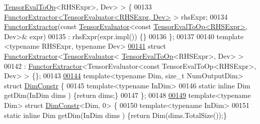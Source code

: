 \begin{DoxyCode}
      \hyperlink{class_eigen_1_1_tensor_eval_to_op}{TensorEvalToOp}<RHSExpr>, Dev> > \{
00133   \hyperlink{struct_eigen_1_1_tensor_sycl_1_1internal_1_1_functor_extractor}{FunctorExtractor<TensorEvaluator<RHSExpr, Dev>} > rhsExpr;
00134   \hyperlink{struct_eigen_1_1_tensor_sycl_1_1internal_1_1_functor_extractor}{FunctorExtractor}(\textcolor{keyword}{const} \hyperlink{struct_eigen_1_1_tensor_evaluator}{TensorEvaluator}<\textcolor{keyword}{const} 
      \hyperlink{class_eigen_1_1_tensor_eval_to_op}{TensorEvalToOp<RHSExpr>}, Dev>& expr)
00135   : rhsExpr(expr.impl()) \{\}
00136 \};
00137 
00140 \textcolor{keyword}{template} <\textcolor{keyword}{typename} RHSExpr, \textcolor{keyword}{typename} Dev>
\hyperlink{struct_eigen_1_1_tensor_sycl_1_1internal_1_1_functor_extractor_3_01_tensor_evaluator_3_01_tensor7896c82115c99c0cee70b3042a1b8761}{00141} \textcolor{keyword}{struct }\hyperlink{struct_eigen_1_1_tensor_sycl_1_1internal_1_1_functor_extractor}{FunctorExtractor}<\hyperlink{struct_eigen_1_1_tensor_evaluator}{TensorEvaluator}<
      \hyperlink{class_eigen_1_1_tensor_eval_to_op}{TensorEvalToOp}<RHSExpr>, Dev> >
00142 : \hyperlink{struct_eigen_1_1_tensor_sycl_1_1internal_1_1_functor_extractor}{FunctorExtractor}<TensorEvaluator<const TensorEvalToOp<RHSExpr>, Dev> > \{\};
00143 
\hyperlink{struct_eigen_1_1_tensor_sycl_1_1internal_1_1_dim_constr}{00144} \textcolor{keyword}{template}<\textcolor{keyword}{typename} Dim, \textcolor{keywordtype}{size\_t} NumOutputDim> \textcolor{keyword}{struct }\hyperlink{struct_eigen_1_1_tensor_sycl_1_1internal_1_1_dim_constr}{DimConstr} \{
00145 \textcolor{keyword}{template}<\textcolor{keyword}{typename} InDim>
00146   \textcolor{keyword}{static} \textcolor{keyword}{inline} Dim getDim(InDim dims ) \{\textcolor{keywordflow}{return} dims;\}
00147 \};
00148 
\hyperlink{struct_eigen_1_1_tensor_sycl_1_1internal_1_1_dim_constr_3_01_dim_00_010_01_4}{00149} \textcolor{keyword}{template}<\textcolor{keyword}{typename} Dim> \textcolor{keyword}{struct }\hyperlink{struct_eigen_1_1_tensor_sycl_1_1internal_1_1_dim_constr}{DimConstr}<Dim, 0> \{
00150   \textcolor{keyword}{template}<\textcolor{keyword}{typename} InDim>
00151     \textcolor{keyword}{static} \textcolor{keyword}{inline} Dim getDim(InDim dims ) \{\textcolor{keywordflow}{return} Dim(dims.TotalSize());\}

\end{DoxyCode}
